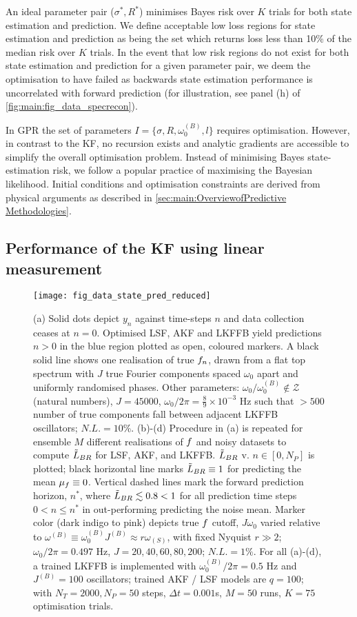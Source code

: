 An ideal parameter pair ($\sigma^*, R^*$) minimises Bayes risk over $K$ trials for both state estimation and prediction.  We define acceptable low loss regions for state estimation and prediction as being the set which returns loss less than 10\% of the median risk over $K$ trials.  In the event that low risk regions do not exist for both state estimation and prediction for a given parameter pair, we deem the optimisation to have failed as backwards state estimation performance is uncorrelated with forward prediction (for illustration, see panel (h) of \cref{fig:main:fig_data_specrecon}).

In GPR the set of parameters $I = \{\sigma, R, \omega_0^{(B)}, l \}$ requires optimisation.  However, in contrast to the KF, no recursion exists and analytic gradients are accessible to simplify the overall optimisation problem. Instead of minimising Bayes state-estimation risk, we follow a popular practice of maximising the Bayesian likelihood. Initial conditions and optimisation constraints are derived from physical arguments as described in \cref{sec:main:OverviewofPredictive Methodologies}.

\subsection{Performance of the KF using linear measurement}
\begin{figure}
    \texttt{[image: fig\_data\_state\_pred\_reduced]}
    \caption{\label{fig:main:fig_data_state_pred} (a) Solid dots depict $y_n$ against time-steps $n$ and data collection ceases at $n=0$. Optimised LSF, AKF and LKFFB yield predictions $n>0$ in the blue region plotted as open, coloured markers. A black solid line shows one realisation of true $f_n$, drawn from a flat top spectrum with $J$ true Fourier components spaced $\omega_0$ apart and uniformly randomised phases. Other parameters: $\omega_0 / \omega_0^{(B)}  \notin \mathcal{Z}$ (natural numbers), $J = 45000$, $\omega_0 / 2\pi = \frac{8}{9} \times 10^{-3}$ Hz such that $>500$ number of true components fall between adjacent LKFFB oscillators; $ N.L.= 10\%$. (b)-(d) Procedure in (a) is repeated for ensemble $M$ different realisations of $f$ and noisy datasets to compute $\tilde{L}_{BR}$ for LSF, AKF, and LKFFB. $\tilde{L}_{BR}$ v. $n \in [0, N_P]$ is plotted; black horizontal line marks $\tilde{L}_{BR} \equiv 1$ for predicting the mean $\mu_f \equiv 0$. Vertical dashed lines mark the forward prediction horizon, $ n^* $, where $  \tilde{L}_{BR} \lesssim 0.8 < 1$ for all prediction time steps  $0< n \leq n^*$ in out-performing predicting the noise mean. Marker color (dark indigo to pink) depicts true $f$ cutoff, $J\omega_0$ varied relative to $\omega^{(B)} \equiv \omega_0^{(B)}J^{(B)} \approx r \omega_{(S)}$, with fixed Nyquist $r\gg2$; $\omega_0 / 2\pi = 0.497$ Hz, $J = 20, 40, 60, 80, 200$; $N.L. = 1\%$.  For all (a)-(d), a trained LKFFB is implemented with $\omega_0^{(B)} / 2\pi = 0.5$ Hz and $J^{(B)} =100$ oscillators; trained AKF / LSF models are $q = 100$; with $N_T = 2000, N_P = 50$ steps, $\Delta t = 0.001$s, $M=50$ runs, $K=75$ optimisation trials.} 
\end{figure}  


